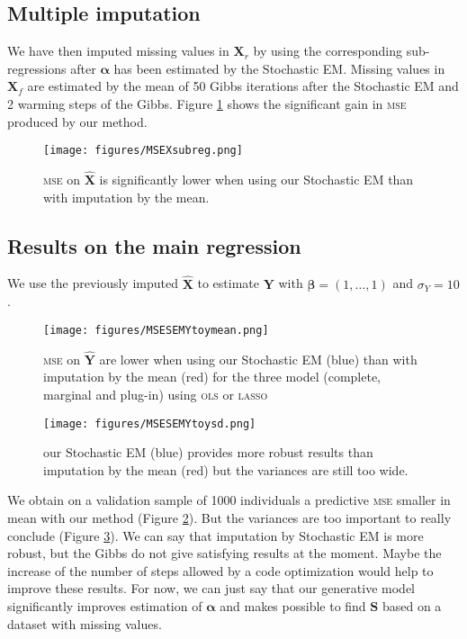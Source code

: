 \documentclass[12pt,a4paper]{report}
\begin{document}
		
			\subsection{Multiple imputation}
			We have then imputed missing values in $\boldsymbol{X}_r$  by using the corresponding sub-regressions after $\boldsymbol{\alpha}$ has been estimated  by the Stochastic EM.
			Missing values in $\boldsymbol{X}_f$ are estimated by the mean of 50 Gibbs iterations after the Stochastic EM and 2 warming steps of the Gibbs. Figure \ref{MSEXsubreg} shows the significant gain in \textsc{mse} produced by our method.
			\begin{figure}[h!]
	\centering
	\texttt{[image: figures/MSEXsubreg.png]} 
	\caption{\textsc{mse} on $\hat{\boldsymbol{X}}$ is significantly lower when using our Stochastic EM than with imputation by the mean.}\label{MSEXsubreg}
\end{figure}  
\FloatBarrier
		\subsection{Results on the main regression}
		We use the previously imputed $\hat{\boldsymbol{X}}$ to estimate $\boldsymbol{Y}$ with $\boldsymbol{\beta}=(1,\dots,1)$ and $\sigma_Y=10$.
			\begin{figure}[h!]
	\centering
	\texttt{[image: figures/MSESEMYtoymean.png]} 
	\caption{\textsc{mse} on $\hat{\boldsymbol{Y}}$ are lower when using our Stochastic EM (blue) than with imputation by the mean (red) for the three model (complete, marginal and plug-in) using \textsc{ols} or \textsc{lasso}}\label{MSESEMYtoymean}
\end{figure}	

			\begin{figure}[h!]
	\centering
	\texttt{[image: figures/MSESEMYtoysd.png]} 
	\caption{our Stochastic EM (blue) provides more robust results than imputation by the mean (red) but the variances are still too wide.}\label{MSESEMYtoysd}
\end{figure}		
We obtain on a validation sample of 1000 individuals a predictive \textsc{mse} smaller in mean with our method (Figure \ref{MSESEMYtoymean}). But the variances are too important to really conclude (Figure \ref{MSESEMYtoysd}). We can say that imputation by Stochastic EM is more robust, but the Gibbs do not give satisfying results at the moment. Maybe the increase of the number of steps allowed by a code optimization would help to improve these results. For now, we can just say that our generative model significantly improves estimation of $\boldsymbol{\alpha}$ and makes possible to find $\boldsymbol{S}$ based on a dataset with missing values.\\
\end{document}
